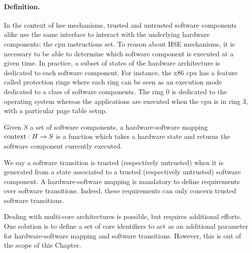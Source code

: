 \paragraph{Definition.} 
%
In the context of \ac{hse} mechanisms, trusted and untrusted software components
alike use the same interface to interact with the underlying hardware
components: the \ac{cpu} instructions set.
%
To reason about HSE mechanisms, it is necessary to be able to determine which
software component is executed at a given time.
%
In practice, a subset of states of the hardware architecture is dedicated to
each software component.
%
For instance, the x86 \ac{cpu} has a feature called protection rings where each
ring can be seen as an execution mode dedicated to a class of software
components.
%
The ring 0 is dedicated to the operating system whereas the applications are
executed when the \ac{cpu} is in ring 3, with a particular page table setup.

\begin{definition}
  \label{def:speccert:hardsoft}
  Given $S$ a set of software components, a hardware-software mapping
  $\mathrm{con\-text} : H \rightarrow S$ is a function which takes a hardware
  state and returns the software component currently executed.
\end{definition}

We say a software transition is trusted (respectively untrusted) when it is
generated from a state associated to a trusted (respectively untrusted) software
component.
%
A hardware-software mapping is mandatory to define requirements over software
transitions.
%
Indeed, these requirements can only concern trusted software
transitions. 
%

Dealing with multi-core architectures is possible, but requires additional
efforts. 
%
One solution is to define a set of core identifiers to act as an additional
parameter for hardware-software mapping and software transitions. 
%
However, this is out of the scope of this Chapter. 

